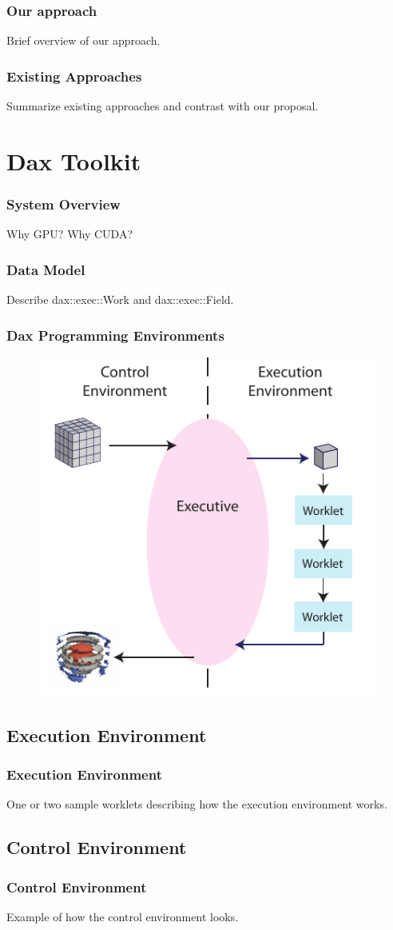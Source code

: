 \documentclass[brown]{beamer}
\begin{document}
\frame
{
  \frametitle{Our approach}
  Brief overview of our approach.
}

\frame
{
  \frametitle{Existing Approaches}
  Summarize existing approaches and contrast with our proposal.
}

\section{Dax Toolkit}

\frame
{
  \frametitle{System Overview}
  Why GPU? Why CUDA?
}

\frame
{
  \frametitle{Data Model}
  Describe dax::exec::Work and dax::exec::Field.
}

\frame
{
  \frametitle{Dax Programming Environments}
  \begin{figure}[htbp]
    \centering
    \includegraphics{images/DaxDiagram}
  \end{figure}
}

\subsection{Execution Environment}
\frame
{
  \frametitle{Execution Environment}
  One or two sample worklets describing how the execution environment works.
}

\subsection{Control Environment}
\frame
{
  \frametitle{Control Environment}
  Example of how the control environment looks.
}
\end{document}
